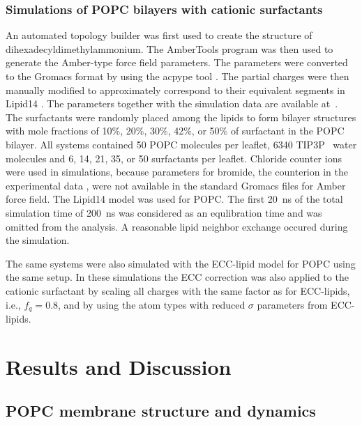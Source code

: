 \documentclass[aip,jcp,twocolumn]{revtex4}
\begin{document}
\subsubsection{Simulations of POPC bilayers with cationic surfactants}
An automated topology builder \cite{malde11} was first used to create the structure of
dihexadecyldimethylammonium.
The AmberTools program \cite{amber} was then used to generate the Amber-type force field
parameters. The parameters were converted to the Gromacs format by using
the acpype tool \cite{acpype}. The partial charges were then manually modified
to approximately correspond to their equivalent segments in Lipid14 \cite{dickson14}.
The parameters together with the simulation data are available
at~\cite{POPClipid14T313K,POPClipid1410perCATsurfT313K,POPClipid1420perCATsurfT313K,POPClipid1430perCATsurfT313K,POPClipid1442perCATsurfT313K,POPClipid1450perCATsurfT313K}.
The surfactants were randomly placed among the lipids to form bilayer structures with
mole fractions of 10\%, 20\%, 30\%, 42\%, or 50\% of surfactant in the POPC bilayer.
All systems contained 50 POPC molecules per leaflet, 6340 TIP3P~\cite{jorgensen83} water molecules and
6, 14, 21, 35, or 50 surfactants per leaflet. 
Chloride counter ions were used
in simulations, because parameters for bromide, the counterion in the experimental data \cite{scherer89},
were not available in the standard Gromacs files for Amber force field.
The Lipid14 model was used for POPC.
The first 20~ns of the total simulation time of 200~ns
was considered as an equlibration time and was omitted from the analysis.
A reasonable lipid neighbor exchange occured during the simulation.


The same systems were also simulated with the ECC-lipid model for POPC using the same setup.
In these simulations the ECC correction was also applied to the cationic surfactant 
by scaling all charges with the same factor as for ECC-lipids, i.e., $f_q=0.8$, 
and by using the atom types with reduced $\sigma$ parameters from ECC-lipids. 

\section{Results and Discussion}

\subsection{POPC membrane structure and dynamics}
\end{document}
